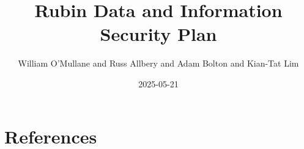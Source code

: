 \documentclass[OPS,authoryear,toc]{lsstdoc}
\title{Rubin Data and Information Security Plan}
\author{%
William O'Mullane and Russ Allbery and Adam Bolton and Kian-Tat Lim
}
\date{2025-05-21}
\begin{document}
\maketitle


\appendix
\section{References} \label{sec:bib}
\renewcommand{\refname}{} %


%
\printglossaries
\end{document}
